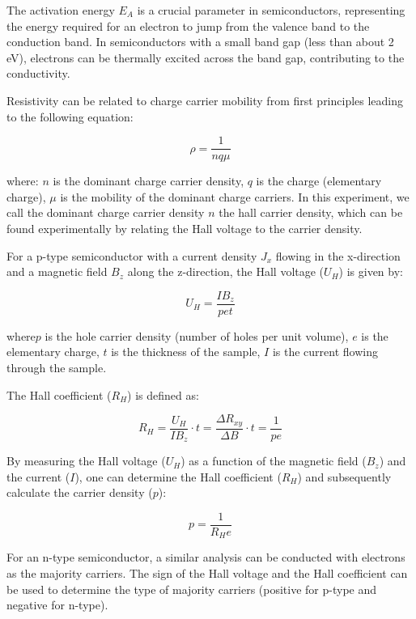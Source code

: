 \documentclass[11pt]{article}
\begin{document}
	The activation energy \( E_A \) is a crucial parameter in semiconductors, representing the energy required for an electron to jump from the valence band to the conduction band. In semiconductors with a small band gap (less than about 2 eV), electrons can be thermally excited across the band gap, contributing to the conductivity.
	
	Resistivity can be related to charge carrier mobility from first principles leading to the following equation:
	
	\begin{equation}
		\rho = \frac{1}{nq \mu} \label{eq:2}
	\end{equation}
	
	where: $n$ is the dominant charge carrier density, $q$ is the charge (elementary charge), $\mu$ is the mobility of the dominant charge carriers. In this experiment, we call the dominant charge carrier density $n$ the hall carrier density, which can be found experimentally by relating the Hall voltage to the carrier density.
	
	For a p-type semiconductor with a current density \(J_x\) flowing in the x-direction and a magnetic field \(B_z\) along the z-direction, the Hall voltage (\(U_H\)) is given by:
	
	\begin{equation}
		U_H = \frac{I B_z}{p e t} \label{eq:3}
	\end{equation}
	
	where\(p\) is the hole carrier density (number of holes per unit volume), \(e\) is the elementary charge, \(t\) is the thickness of the sample, \(I\) is the current flowing through the sample.
	
	The Hall coefficient (\(R_H\)) is defined as:
	
	\begin{equation}
		R_H = \frac{U_H}{I B_z} \cdot t = \frac{\Delta R_{xy}}{\Delta B } \cdot t = \frac{1}{p e} \label{eq:4}
	\end{equation}
	
	By measuring the Hall voltage (\(U_H\)) as a function of the magnetic field (\(B_z\)) and the current (\(I\)), one can determine the Hall coefficient (\(R_H\)) and subsequently calculate the carrier density (\(p\)):
	
	\begin{equation}
		p = \frac{1}{R_H e} \label{eq:5}
	\end{equation}
	
	For an n-type semiconductor, a similar analysis can be conducted with electrons as the majority carriers. The sign of the Hall voltage and the Hall coefficient can be used to determine the type of majority carriers (positive for p-type and negative for n-type).
	
\end{document}

